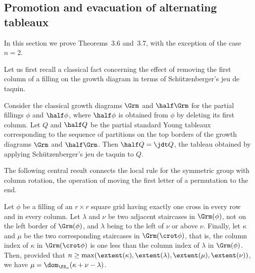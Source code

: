 \subsection{Promotion and evacuation of alternating tableaux}
\label{sec:alternating}
In this section we prove Theorems~3.6
and~3.7, with the exception of
the case $n=2$.

Let us first recall a classical fact concerning the effect of
removing the first column of a filling on the growth diagram in terms
of Schützenberger's jeu de taquin.
\begin{prop}
 \label{prop:jdt-delete-column}
 Consider the classical growth diagrams $\Grm$ and $\half\Grm$ for the
 partial fillings $\phi$ and $\half\phi$, where $\half\phi$ is
 obtained from $\phi$ by deleting its first column. Let $Q$ and
 $\half Q$
 be the partial standard Young tableaux corresponding to the
 sequence of partitions on the top borders
 of the growth diagrams $\Grm$ and $\half\Grm$. Then
 $\half Q = \jdt Q$, the tableau obtained by applying
 Schützenberger's jeu de taquin to $Q$.
%
%
%
%
%
%
%
\end{prop}

The following central result connects the local rule for the symmetric group with column rotation, the operation of moving the first letter of a permutation to the end.
\begin{theo}\label{thm:growth-diagram-rotation}
 Let $\phi$ be a filling of an $r\times r$ square grid having
 exactly one cross in every row and in every column. Let $\lambda$
 and $\nu$ be two adjacent staircases in $\Grm(\phi)$, not on the left
 border of $\Grm(\phi)$, and $\lambda$ being to the left of $\nu$ or
 above $\nu$. Finally, let $\kappa$ and $\mu$ be the two
 corresponding staircases in $\Grm(\crot\phi)$, that is, the column
 index of $\kappa$ in $\Grm(\crot\phi)$ is one less than the column
 index of $\lambda$ in $\Grm(\phi)$. Then, provided that
 $n\geq\max(\extent(\kappa),\extent(\lambda),\extent(\mu),\extent(\nu))$,
 we have $\mu = \dom_{\fS_n}(\kappa+\nu-\lambda)$.
\end{theo}

